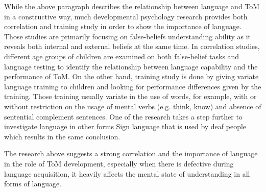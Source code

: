 \documentclass[12pt]{article}
\begin{document}
While the above paragraph describes the relationship between language and ToM in a constructive way, much developmental psychology research provides both correlation and training study in order to show the importance of language. Those studies are primarily focusing on false-beliefs understanding ability as it reveals both internal and external beliefs at the same time. In correlation studies, different age groups of children are examined on both false-belief tasks and language testing to identify the relationship between language capability and the performance of ToM\cite{Ebert_2020}. On the other hand, training study is done by giving variate language training to children and looking for performance differences given by the training. Those training usually variate in the use of words, for example, with or without restriction on the usage of mental verbs (e.g. think, know) and absence of sentential complement sentences\cite{Lohmann_2003}. One of the research\cite{Pyers_2009} takes a step further to investigate language in other forms \- Sign language that is used by deaf people which results in the same conclusion.
 
The research above suggests a strong correlation and the importance of language in the role of ToM development, especially when there is defective during language acquisition, it heavily affects the mental state of understanding in all forms of language.
\end{document}
